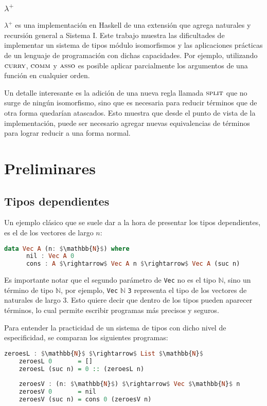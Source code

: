 \documentclass[]{report}
\begin{document}
	\subsection{$\lambda^+$}
	$\lambda^+$ \cite{lambda-plus} es una implementación en Haskell de una extensión que agrega naturales y recursión general a Sistema I.
	Este trabajo muestra las dificultades de implementar un sistema de tipos módulo isomorfismos y las aplicaciones prácticas de un lenguaje de programación con dichas capacidades.
	Por ejemplo, utilizando $\textsc{curry}$, $\textsc{comm}$ y $\textsc{asso}$ es posible aplicar parcialmente los argumentos de una función en cualquier orden.
	
	Un detalle interesante es la adición de una nueva regla llamada $\textsc{split}$ que no surge de ningún isomorfismo, sino que es necesaria para reducir términos que de otra forma quedarían atascados.
	Esto muestra que desde el punto de vista de la implementación, puede ser necesario agregar nuevas equivalencias de términos para lograr reducir a una forma normal.

	
	\chapter{Preliminares}
	
	\section{Tipos dependientes}
	Un ejemplo clásico que se suele dar a la hora de presentar los tipos dependientes, es el de los vectores de largo $n$:
	
	\begin{lstlisting}[mathescape, language=Haskell]
	data Vec A (n: $\mathbb{N}$) where
	  nil : Vec A 0
	  cons : A $\rightarrow$ Vec A n $\rightarrow$ Vec A (suc n)
	\end{lstlisting}
	
	Es importante notar que el segundo parámetro de \verb|Vec| no es el tipo $\mathbb{N}$, sino un término de tipo $\mathbb{N}$, por ejemplo, \verb|Vec| $\mathbb{N}$ \verb|3| representa el tipo de los vectores de naturales de largo 3.
	Esto quiere decir que dentro de los tipos pueden aparecer términos, lo cual permite escribir programas más precisos y seguros.
	
	Para entender la practicidad de un sistema de tipos con dicho nivel de especificidad, se comparan los siguientes programas:
	\begin{lstlisting}[mathescape, language=Haskell]
	zeroesL : $\mathbb{N}$ $\rightarrow$ List $\mathbb{N}$
	zeroesL 0       = []
	zeroesL (suc n) = 0 :: (zeroesL n)
	
	zeroesV : (n: $\mathbb{N}$) $\rightarrow$ Vec $\mathbb{N}$ n
	zeroesV 0       = nil
	zeroesV (suc n) = cons 0 (zeroesV n)
	\end{lstlisting}
	
\end{document}
